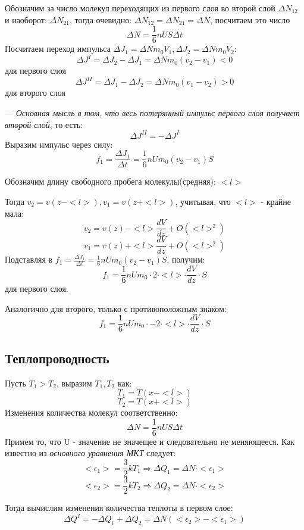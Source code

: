 \vspace{5px}

Обозначим за число молекул переходящих из первого слоя во второй слой $\Delta N_{12}$ и наоборот: $\Delta N_{21}$, тогда очевидно: $\Delta N_{12} = \Delta N_{21} = \Delta N$, посчитаем это число
\[\Delta N = \frac{1}{6} n U S \Delta t\]
Посчитаем переход импульса $\Delta J_1 = \Delta N m_0V_1 , \Delta J_2 = \Delta N m_0V_2$:
\[\Delta J^{I} = \Delta J_2 - \Delta J_1 = \Delta N m_0(v_2 - v_1) < 0\]
для первого слоя
\newpage
\[\Delta J^{II} = \Delta J_1 - \Delta J_2 = \Delta N m_0(v_1 - v_2) > 0\]
для второго слоя

\vspace{5px}

--- \textit{Основная мысль в том, что  весь потерянный импульс первого слоя получает второй слой}, то есть:
\[\Delta J^{II} = -\Delta J^{I}\]
Выразим импульс через силу:
\[f_1 = \frac{\Delta J_1}{\Delta t} = \frac{1}{6}nUm_0(v_2 - v_1)S\]

Обозначим длину свободного пробега молекулы(средняя): $<l>$

\vspace{5px}

Тогда $v_2 = v(z - <l>), v_1 = v(z + <l>)$, учитывая, что $<l>$ - крайне мала:
\[v_2 = v(z) - <l>\frac{dV}{dz} + O(<l>^2)\]
\[v_1 = v(z) + <l>\frac{dV}{dz} + O(<l>^2)\]
Подставляя в $f_1 = \frac{\Delta J_1}{\Delta t} = \frac{1}{6}nUm_0(v_2 - v_1)S$, получим:
\[f_1 = \frac{1}{6}nUm_0 \cdot 2 \cdot <l> \cdot \frac{dV}{dz} \cdot S\]
для первого слоя.

\vspace{5px}

Аналогично для второго, только с противоположным знаком:
\[f_1 = \frac{1}{6}nUm_0 \cdot -2 \cdot <l> \cdot \frac{dV}{dz} \cdot S\]

\subsection{Теплопроводность}
Пусть $T_1 > T_2$, выразим $T_1, T_2$ как:
\[T_1 = T(x - <l>)\]
\[T_2 = T(x+<l>)\]
Изменения количества молекул соответственно:
\[\Delta N = \frac{1}{6}nUS\Delta t\]
Примем то, что U - значение не значещее и следовательно не меняющееся. Как известно из \textit{основного уравнения МКТ} следует:
\[<\epsilon_1> = \frac{3}{2}kT_1 \Rightarrow \Delta Q_1 = \Delta N \cdot <\epsilon_1>\]
\[<\epsilon_2> = \frac{3}{2}kT_2 \Rightarrow \Delta Q_2 = \Delta N \cdot <\epsilon_2>\]

Тогда вычислим изменения количества теплоты в первом слое:
\[ \Delta Q ^{I} = -\Delta Q_1 + \Delta Q_2 = \Delta N(<\epsilon_2> - <\epsilon_1>)\]

